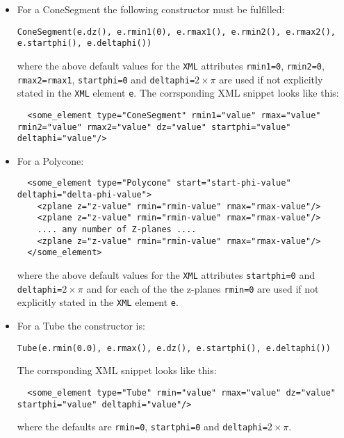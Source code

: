 \begin{itemize}
\item For a ConeSegment the following constructor must be fulfilled: 
\begin{verbatim}
ConeSegment(e.dz(), e.rmin1(0), e.rmax1(), e.rmin2(), e.rmax2(), e.startphi(), e.deltaphi())
\end{verbatim}
where the above default values for the \texttt{XML} attributes \texttt{rmin1=0}, \texttt{rmin2=0},
\texttt{rmax2=rmax1}, \texttt{startphi=0} and \texttt{deltaphi=$2\times\pi$}
are used if not explicitly stated in the \texttt{XML} element \texttt{e}.
The corrsponding XML snippet looks like this:
\begin{verbatim}
  <some_element type="ConeSegment" rmin1="value" rmax="value" rmin2="value" rmax2="value" dz="value" startphi="value" deltaphi="value"/>
\end{verbatim}

\item For a Polycone:
\vspace{-0.2cm}
\begin{verbatim}
  <some_element type="Polycone" start="start-phi-value" deltaphi="delta-phi-value">
    <zplane z="z-value" rmin="rmin-value" rmax="rmax-value"/>
    <zplane z="z-value" rmin="rmin-value" rmax="rmax-value"/>
    .... any number of Z-planes ....
    <zplane z="z-value" rmin="rmin-value" rmax="rmax-value"/>
  </some_element>
\end{verbatim}
where the above default values for the \texttt{XML} attributes \texttt{startphi=0} and
\texttt{deltaphi=$2\times\pi$} and for each of the the z-planes \texttt{rmin=0}
are used if not explicitly stated in the \texttt{XML} element \texttt{e}.

\item For a Tube the constructor is:
\begin{verbatim}
Tube(e.rmin(0.0), e.rmax(), e.dz(), e.startphi(), e.deltaphi())
\end{verbatim}
The corrsponding XML snippet looks like this:
\begin{verbatim}
  <some_element type="Tube" rmin="value" rmax="value" dz="value" startphi="value" deltaphi="value"/>
\end{verbatim}
where the defaults are \texttt{rmin=0}, \texttt{startphi=0} and \texttt{deltaphi=$2\times\pi$}.


\end{itemize}
